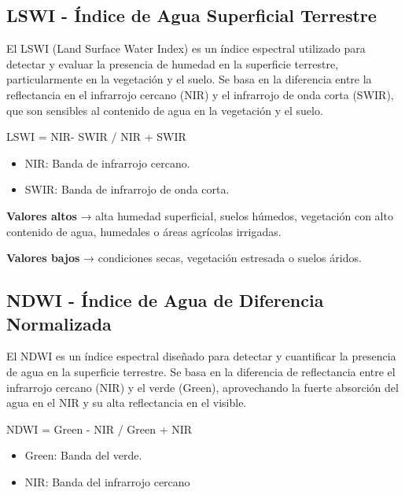 \documentclass[
]{book}
\providecommand{\tightlist}{%
  \setlength{\itemsep}{0pt}\setlength{\parskip}{0pt}}
\begin{document}
\subsection{\texorpdfstring{\textbf{LSWI} - Índice de Agua Superficial Terrestre}{LSWI - Índice de Agua Superficial Terrestre}}\label{lswi---uxedndice-de-agua-superficial-terrestre}

El LSWI (Land Surface Water Index) es un índice espectral utilizado para detectar y evaluar la presencia de humedad en la superficie terrestre, particularmente en la vegetación y el suelo. Se basa en la diferencia entre la reflectancia en el infrarrojo cercano (NIR) y el infrarrojo de onda corta (SWIR), que son sensibles al contenido de agua en la vegetación y el suelo.

LSWI = NIR- SWIR / NIR + SWIR\hspace{0pt}

\begin{itemize}
\item
  NIR: Banda de infrarrojo cercano.
\item
  SWIR: Banda de infrarrojo de onda corta.
\end{itemize}

\textbf{Valores altos} → alta humedad superficial, suelos húmedos, vegetación con alto contenido de agua, humedales o áreas agrícolas irrigadas.

\textbf{Valores bajos} → condiciones secas, vegetación estresada o suelos áridos.

\subsection{\texorpdfstring{\textbf{NDWI} - Índice de Agua de Diferencia Normalizada}{NDWI - Índice de Agua de Diferencia Normalizada}}\label{ndwi---uxedndice-de-agua-de-diferencia-normalizada}

El NDWI es un índice espectral diseñado para detectar y cuantificar la presencia de agua en la superficie terrestre. Se basa en la diferencia de reflectancia entre el infrarrojo cercano (NIR) y el verde (Green), aprovechando la fuerte absorción del agua en el NIR y su alta reflectancia en el visible.

NDWI = Green - NIR / Green + NIR\hspace{0pt}

\begin{itemize}
\tightlist
\item
  Green: Banda del verde.\\
\item
  NIR: Banda del infrarrojo cercano
\end{itemize}
\end{document}
